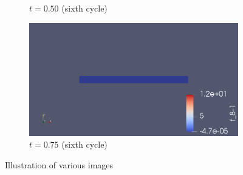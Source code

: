 \documentclass{article}
\begin{document}
\begin{figure}[ht]
\begin{subfigure}[b]{0.5\linewidth}
    \caption{$t=0.50$ (sixth cycle)} 
    \label{fig7:c} 
  \end{subfigure}%
  \begin{subfigure}[b]{0.5\linewidth}
    \centering
    \includegraphics[width=1\linewidth]{pressure_time_075.png} 
    \caption{$t=0.75$ (sixth cycle)} 
    \label{fig7:d} 
  \end{subfigure} 
  \caption{Illustration of various images}
  \label{fig7} 
\end{figure}
\end{document}
